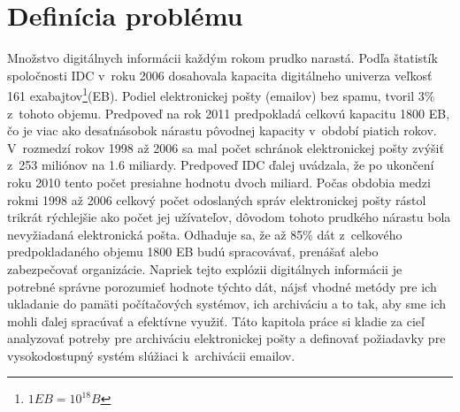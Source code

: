 \documentclass[11pt,twoside,a4paper]{book}
\begin{document}

% 

% 


\chapter{Definícia problému}

Množstvo digitálnych informácii každým rokom prudko narastá. Podľa štatistík spoločnosti IDC \cite{Gantz_Mcarthur_Minton_2007} v~roku 2006 dosahovala kapacita digitálneho univerza veľkosť 161 exabajtov\footnote{$1 EB = 10^{18}B$}(EB). Podiel elektronickej pošty (emailov) bez spamu, tvoril 3\% z~tohoto objemu. Predpoveď na rok 2011 \cite{Gantz_Chute_Manfrediz_Minton_Reinsel_Schlichting_Toncheva_2008} predpokladá celkovú kapacitu 1800 EB, čo je viac ako desaťnásobok nárastu pôvodnej kapacity v~období piatich rokov. V~rozmedzí rokov 1998 až 2006 sa mal počet schránok elektronickej pošty zvýšiť z~253 miliónov na 1.6 miliardy. Predpoveď IDC ďalej uvádzala, že po ukončení roku 2010 tento počet presiahne hodnotu dvoch miliard. Počas obdobia medzi rokmi 1998 až 2006 celkový počet odoslaných správ elektronickej pošty rástol trikrát rýchlejšie ako počet jej užívateľov, dôvodom tohoto prudkého nárastu bola nevyžiadaná elektronická pošta. Odhaduje sa, že až 85\% dát z~celkového predpokladaného objemu 1800 EB budú spracovávať, prenášať alebo zabezpečovať organizácie. Napriek tejto explózii digitálnych informácii je potrebné správne porozumieť hodnote týchto dát, nájsť vhodné metódy pre ich ukladanie do pamäti počítačových systémov, ich archiváciu a to tak, aby sme ich mohli ďalej spracúvať a efektívne využiť. Táto kapitola práce si kladie za cieľ analyzovať potreby pre archiváciu elektronickej pošty a definovať požiadavky pre vysokodostupný systém slúžiaci k~archivácii emailov.
\end{document}
